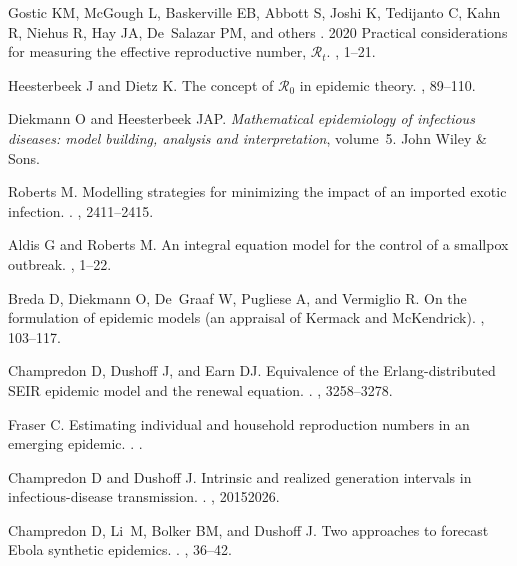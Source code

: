 \documentclass[12pt]{article}
\begin{document}
\begin{thebibliography}{10}
Gostic KM, McGough L, Baskerville EB, Abbott S, Joshi K, Tedijanto C, Kahn R,
  Niehus R, Hay JA, De~Salazar PM, and others .
 2020 Practical considerations for measuring the effective
  reproductive number, $\mathcal{R}_t$.
, 1--21.

Heesterbeek J and Dietz K.
 The concept of $\mathcal{R}_0$ in epidemic theory.
, 89--110.

Diekmann O and Heesterbeek JAP.
 {\em Mathematical epidemiology of infectious diseases: model
  building, analysis and interpretation}, volume~5.
\newblock John Wiley \& Sons.

Roberts M.
 Modelling strategies for minimizing the impact of an imported
  exotic infection.
.
, 2411--2415.

Aldis G and Roberts M.
 An integral equation model for the control of a smallpox
  outbreak.
, 1--22.

Breda D, Diekmann O, De~Graaf W, Pugliese A, and Vermiglio R.
 {On the formulation of epidemic models (an appraisal of Kermack
  and McKendrick)}.
, 103--117.

Champredon D, Dushoff J, and Earn DJ.
 Equivalence of the {Erlang}-distributed {SEIR} epidemic model
  and the renewal equation.
.
, 3258--3278.

Fraser C.
 Estimating individual and household reproduction numbers in an
  emerging epidemic.
.
.

Champredon D and Dushoff J.
 Intrinsic and realized generation intervals in
  infectious-disease transmission.
.
, 20152026.

Champredon D, Li~M, Bolker BM, and Dushoff J.
 Two approaches to forecast {Ebola} synthetic epidemics.
.
, 36--42.


\end{thebibliography}
\end{document}
